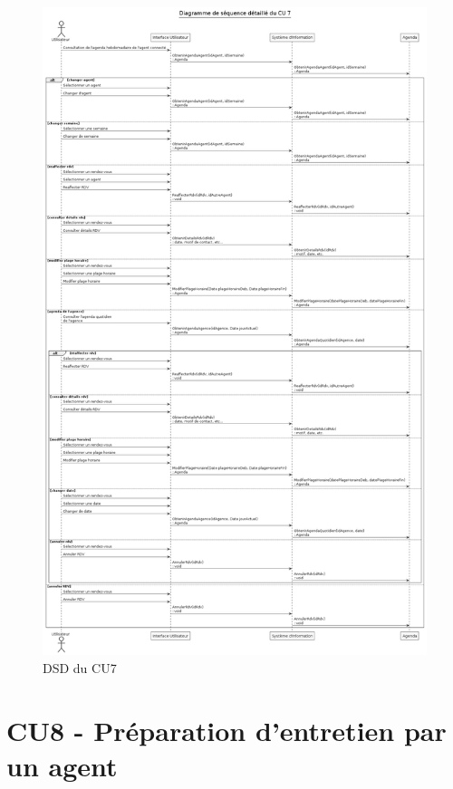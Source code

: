 \begin{figure}[h]
\centering
\includegraphics[width=\textwidth]{figures/DSD_CU7.png}
\caption{DSD du CU7}
\end{figure}

\clearpage
\section{CU8 - Préparation d’entretien par un agent}

